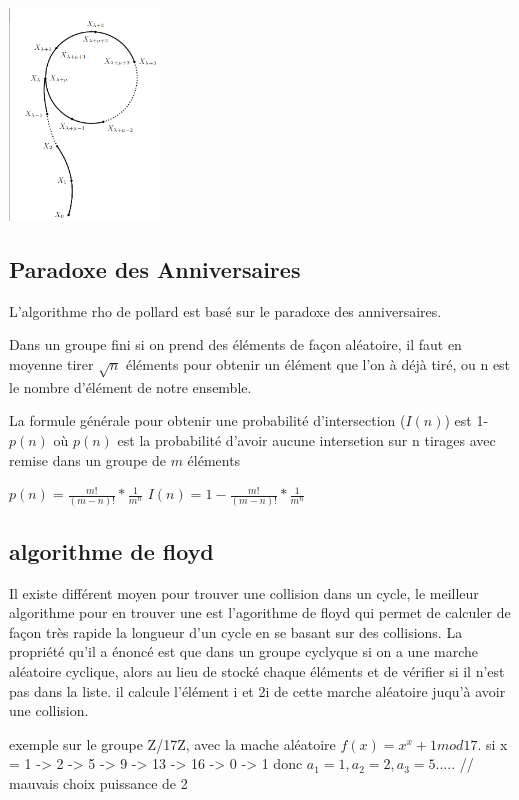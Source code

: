\documentclass[a4paper,10pt]{report}
\begin{document}
\begin{center}
 \includegraphics[width=4cm]{dessin_rho_pollard_bon.png}
\end{center}

\subsection{Paradoxe des Anniversaires}
L'algorithme rho de pollard est basé sur le paradoxe des anniversaires.

 Dans un groupe fini si on prend des éléments de façon aléatoire,
il faut en moyenne tirer $\sqrt{n}$ éléments pour obtenir un élément que l'on à déjà tiré, ou n est le nombre d'élément de notre ensemble.

La formule générale pour obtenir une probabilité d'intersection ($I(n)$) est 1-$p(n)$ où $p(n)$ est la probabilité d'avoir aucune intersetion sur n tirages avec remise dans un groupe de $m$ éléments
\begin{center}
    $p(n) = \frac{m!}{(m - n)!}*\frac{1}{m^n}$
    $I(n) = 1 - \frac{m!}{(m - n)!}*\frac{1}{m^n}$
\end{center}




\subsection{algorithme de floyd}

Il existe différent moyen pour trouver une collision dans un cycle, le meilleur algorithme pour en trouver
une est l'agorithme de floyd qui permet de calculer de façon très rapide la longueur d'un cycle en se basant sur des collisions.
La propriété qu'il a énoncé est que dans un groupe cyclyque si on a une marche aléatoire cyclique, alors au lieu de stocké chaque 
éléments et de vérifier si il n'est pas dans la liste. il calcule l'élément i et 2i de cette marche aléatoire juqu'à avoir une 
collision.

exemple sur le groupe Z/17Z, avec la mache aléatoire $f(x) = x^x + 1 mod 17$.
si x = 1 -> 2 -> 5 -> 9 -> 13 -> 16 -> 0 -> 1
donc $a_1 = 1, a_2 = 2, a_3 = 5 .....$
// mauvais choix puissance de 2
\end{document}
